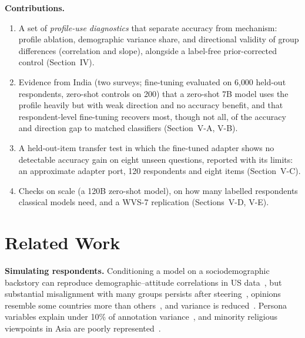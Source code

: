 \documentclass[conference]{IEEEtran}
\begin{document}
\textbf{Contributions.}
\begin{enumerate}
    \item A set of \emph{profile-use diagnostics} that separate accuracy from mechanism: profile ablation, demographic variance share, and directional validity of group differences (correlation and slope), alongside a label-free prior-corrected control (Section~IV).
    \item Evidence from India (two surveys; fine-tuning evaluated on 6{,}000 held-out respondents, zero-shot controls on 200) that a zero-shot 7B model uses the profile heavily but with weak direction and no accuracy benefit, and that respondent-level fine-tuning recovers most, though not all, of the accuracy and direction gap to matched classifiers (Section~V-A, V-B).
    \item A held-out-item transfer test in which the fine-tuned adapter shows no detectable accuracy gain on eight unseen questions, reported with its limits: an approximate adapter port, 120 respondents and eight items (Section~V-C).
    \item Checks on scale (a 120B zero-shot model), on how many labelled respondents classical models need, and a WVS-7 replication (Sections~V-D, V-E).
\end{enumerate}

\section{Related Work}

\textbf{Simulating respondents.} Conditioning a model on a sociodemographic backstory can reproduce demographic--attitude correlations in US data~\cite{argyle2023}, but substantial misalignment with many groups persists after steering~\cite{santurkar2023}, opinions resemble some countries more than others~\cite{durmus2023}, and variance is reduced~\cite{bisbee2024}. Persona variables explain under 10\% of annotation variance~\cite{hu2024}, and minority religious viewpoints in Asia are poorly represented~\cite{shankar2026}.
\end{document}
